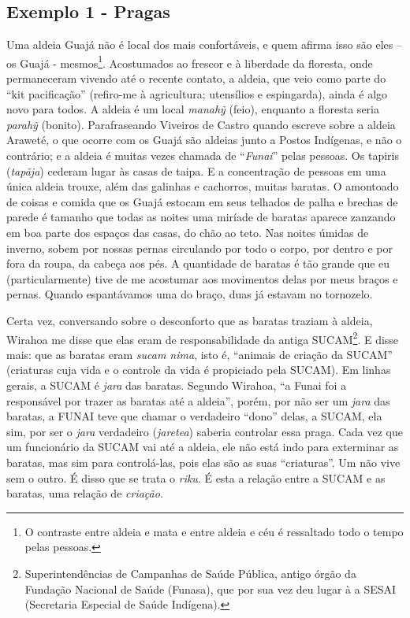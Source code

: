 \subsection{Exemplo 1 - Pragas}

Uma aldeia Guajá não é local dos mais confortáveis, e quem afirma isso
são eles -- os Guajá - mesmos\footnote{O contraste entre aldeia e mata e
  entre aldeia e céu é ressaltado todo o tempo pelas pessoas.}.
Acostumados ao frescor e à liberdade da floresta, onde permaneceram
vivendo até o recente contato, a aldeia, que veio como parte do ``kit
pacificação'' (refiro-me à agricultura; utensílios e espingarda), ainda
é algo novo para todos. A aldeia é um local \emph{manahỹ} (feio),
enquanto a floresta seria \emph{parahỹ} (bonito). Parafraseando Viveiros
de Castro quando escreve sobre a aldeia Araweté, o que ocorre com os
Guajá são aldeias junto a Postos Indígenas, e não o contrário; e a
aldeia é muitas vezes chamada de ``\emph{Funai}'' pelas pessoas. Os
tapiris (\emph{tapãja}) cederam lugar às casas de taipa. E a
concentração de pessoas em uma única aldeia trouxe, além das galinhas e
cachorros, muitas baratas. O amontoado de coisas e comida que os Guajá
estocam em seus telhados de palha e brechas de parede é tamanho que
todas as noites uma miríade de baratas aparece zanzando em boa parte dos
espaços das casas, do chão ao teto. Nas noites úmidas de inverno, sobem
por nossas pernas circulando por todo o corpo, por dentro e por fora da
roupa, da cabeça aos pés. A quantidade de baratas é tão grande que eu
(particularmente) tive de me acostumar aos movimentos delas por meus
braços e pernas. Quando espantávamos uma do braço, duas já estavam no
tornozelo.

Certa vez, conversando sobre o desconforto que as baratas traziam à
aldeia, Wirahoa me disse que elas eram de responsabilidade da antiga
SUCAM\footnote{Superintendências de Campanhas de Saúde Pública, antigo
  órgão da Fundação Nacional de Saúde (Funasa), que por sua vez deu
  lugar à a SESAI (Secretaria Especial de Saúde Indígena).}. E disse
mais: que as baratas eram \emph{sucam nima}, isto é, ``animais de
criação da SUCAM'' (criaturas cuja vida e o controle da vida é
propiciado pela SUCAM). Em linhas gerais, a SUCAM é \emph{jara} das
baratas. Segundo Wirahoa, ``a Funai foi a responsável por trazer as
baratas até a aldeia'', porém, por não ser um \emph{jara} das baratas, a
FUNAI teve que chamar o verdadeiro ``dono'' delas, a SUCAM, ela sim, por
ser o \emph{jara} verdadeiro (\emph{jaretea}) saberia controlar essa
praga. Cada vez que um funcionário da SUCAM vai até a aldeia, ele não
está indo para exterminar as baratas, mas sim para controlá-las, pois
elas são as suas ``criaturas''. Um não vive sem o outro. É disso que se
trata o \emph{riku}. É esta a relação entre a SUCAM e as baratas, uma
relação de \emph{criação}.

